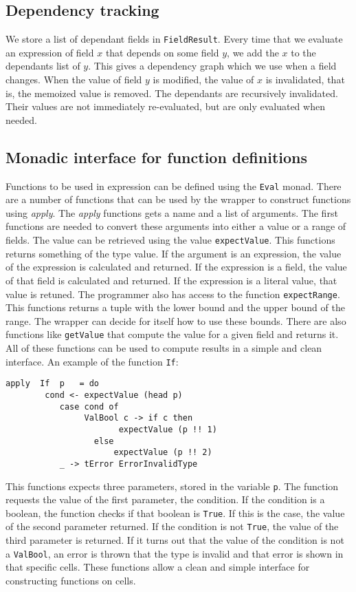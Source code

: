\documentclass{article}
\begin{document}
	\subsection{Dependency tracking}
	We store a list of dependant fields in \texttt{FieldResult}. Every time that we evaluate an expression of field $x$ that depends on some field $y$, we add the $x$ to the dependants list of $y$. This gives a dependency graph which we use when a field changes. When the value of field $y$ is modified, the value of $x$ is invalidated, that is, the memoized value is removed. The dependants are recursively invalidated. Their values are not immediately re-evaluated, but are only evaluated when needed.
	
	\subsection{Monadic interface for function definitions}
	Functions to be used in expression can be defined using the \texttt{Eval} monad. There are a number of functions that can be used by the wrapper to construct functions using \textit{apply}. The \textit{apply} functions gets a name and a list of arguments. The first functions are needed to convert these arguments into either a value or a range of fields. The value can be retrieved using the value \texttt{expectValue}. This functions returns something of the type value. If the argument is an expression, the value of the expression is calculated and returned. If the expression is a field, the value of that field is calculated and returned. If the expression is a literal value, that value is retuned. The programmer also has access to the function \texttt{expectRange}. This functions returns a tuple with the lower bound and the upper bound of the range. The wrapper can decide for itself how to use these bounds. There are also functions like \texttt{getValue} that compute the value for a given field and returns it. All of these functions can be used to compute results in a simple and clean interface. An example of the function \texttt{If}:
\begin{verbatim}
apply  If  p   = do
		cond <- expectValue (head p)
           case cond of
                ValBool c -> if c then
              		   expectValue (p !! 1)
           		  else
               		  expectValue (p !! 2)
           _ -> tError ErrorInvalidType                  	
\end{verbatim}	
This functions expects three parameters, stored in the variable \texttt{p}. The function requests the value of the first parameter, the condition. If the condition is a boolean, the function checks if that boolean is \texttt{True}. If this is the case, the value of the second parameter returned. If the condition is not \texttt{True}, the value of the third parameter is returned. If it turns out that the value of the condition is not a \texttt{ValBool}, an error is thrown that the type is invalid and that error is shown in that specific cells. These functions allow a clean and simple interface for constructing functions on cells. 
\end{document}
